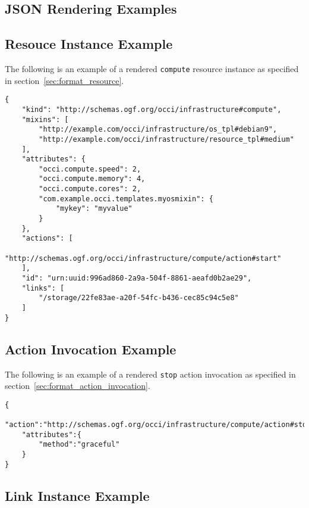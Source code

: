 \documentclass[10pt,a4paper]{article}
\begin{document}
\clearpage
\begin{appendices}

\lstset{
   language=json,
   basicstyle=\footnotesize,
   xleftmargin=0.0cm
}

\section{JSON Rendering Examples}
\subsection{Resouce Instance Example}
\label{resouce_instance_rendering_example}

The following is an example of a rendered \texttt{compute} resource instance as specified in section~\ref{sec:format_resource}.

\begin{lstlisting}
{
    "kind": "http://schemas.ogf.org/occi/infrastructure#compute",
    "mixins": [
        "http://example.com/occi/infrastructure/os_tpl#debian9",
        "http://example.com/occi/infrastructure/resource_tpl#medium"
    ],
    "attributes": {
        "occi.compute.speed": 2,
        "occi.compute.memory": 4,
        "occi.compute.cores": 2,
        "com.example.occi.templates.myosmixin": {
            "mykey": "myvalue"
        }
    },
    "actions": [
        "http://schemas.ogf.org/occi/infrastructure/compute/action#start"
    ],
    "id": "urn:uuid:996ad860-2a9a-504f-8861-aeafd0b2ae29",
    "links": [
        "/storage/22fe83ae-a20f-54fc-b436-cec85c94c5e8"
    ]
}
\end{lstlisting}

\subsection{Action Invocation Example}
\label{action_invocation_rendering_example}

The following is an example of a rendered \texttt{stop} action invocation as specified in section~\ref{sec:format_action_invocation}.

\begin{lstlisting}
{
    "action":"http://schemas.ogf.org/occi/infrastructure/compute/action#stop",
    "attributes":{
        "method":"graceful"
    }
}
\end{lstlisting}

\subsection{Link Instance Example}
\label{link_instance_rendering_example}


\end{appendices}
\end{document}
